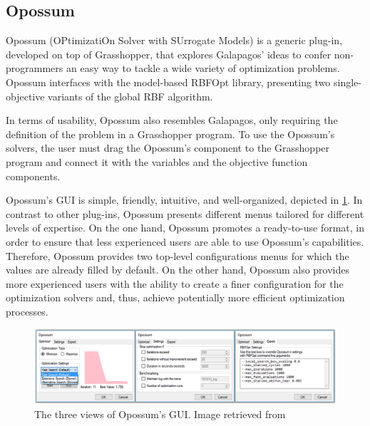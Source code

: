 %		
	
	\subsection{Opossum}
	Opossum (OPtimizatiOn Solver with SUrrogate Models) is a generic plug-in, developed on top of Grasshopper, that explores Galapagos' ideas to confer non-programmers an easy way to tackle a wide variety of optimization problems. Opossum interfaces with the model-based RBFOpt library, presenting two single-objective variants of the global \ac{RBF} algorithm. 
	
	In terms of usability, Opossum also resembles Galapagos, only requiring the definition of the problem in a Grasshopper program. To use the Opossum's solvers, the user must drag the Opossum's component to the Grasshopper program and connect it with the variables and the objective function components.
	
	Opossum's \ac{GUI} is simple, friendly, intuitive, and well-organized, depicted in \cref{fig:opossum}. In contrast to other plug-ins, Opossum presents different menus tailored for different levels of expertise. On the one hand, Opossum promotes a ready-to-use format, in order to ensure that less experienced users are able to use Opossum's capabilities. Therefore, Opossum provides two top-level configurations menus for which the values are already filled by default. On the other hand, Opossum also provides more experienced users with the ability to create a finer configuration for the optimization solvers and, thus, achieve potentially more efficient optimization processes. 
	
	\begin{figure}
		\centering
		\includegraphics[width=1\textwidth]{Images/Background/Opossum/opossum_1.png}
		\caption[Opossum GUI]{The three views of Opossum's \ac{GUI}. Image retrieved from~\cite{Wortmann2017Opossum}}
		\label{fig:opossum}
	\end{figure}
	
